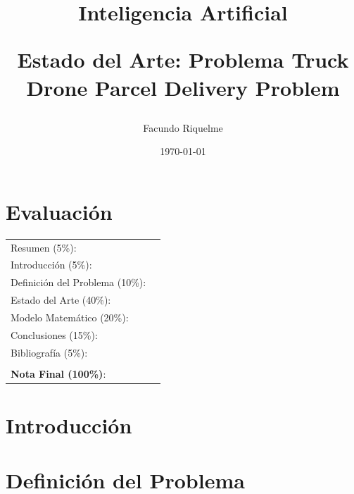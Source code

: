 \documentclass[letter, 10pt]{article}
\begin{document}
\title{Inteligencia Artificial \\ \begin{Large}Estado del Arte: Problema Truck Drone Parcel Delivery Problem\end{Large}}
\author{Facundo Riquelme}
\date{\today}
\maketitle


\section*{Evaluaci\'on}

\begin{tabular}{ll}
Resumen (5\%): & \underline{\hspace{2cm}} \\
Introducci\'on (5\%):  & \underline{\hspace{2cm}} \\
Definici\'on del Problema (10\%):  & \underline{\hspace{2cm}} \\
Estado del Arte (40\%):  & \underline{\hspace{2cm}} \\
Modelo Matem\'atico (20\%): &  \underline{\hspace{2cm}}\\
Conclusiones (15\%): &  \underline{\hspace{2cm}}\\
Bibliograf\'ia (5\%): & \underline{\hspace{2cm}}\\
 &  \\
\textbf{Nota Final (100\%)}:   & \underline{\hspace{2cm}}
\end{tabular}
\vspace{2cm}

\begin{abstract}

\end{abstract}

\section{Introducci\'on}


\section{Definici\'on del Problema}

\end{document}
